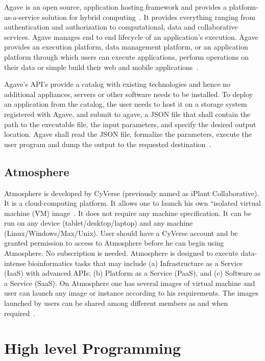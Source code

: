 Agave is an open source, application hosting framework and provides a
platform-as-a-service solution for hybrid
computing~\cite{agave-paper}. It provides everything ranging from
authentication and authorization to computational, data and
collaborative services. Agave manages end to end lifecycle of an
application’s execution.  Agave provides an execution platform, data
management platform, or an application platform through which users
can execute applications, perform operations on their data or simple
build their web and mobile applications~\cite{www-agaveapi-features}.

Agave’s API’s provide a catalog with existing technologies and hence
no additional appliances, servers or other software needs to be
installed. To deploy an application from the catalog, the user needs
to host it on a storage system registered with Agave, and submit to
agave, a JSON file that shall contain the path to the executable file,
the input parameters, and specify the desired output location. Agave
shall read the JSON file, formalize the parameters, execute the user
program and dump the output to the requested
destination~\cite{agave-paper}.

\subsection{Atmosphere}

Atmosphere is developed by CyVerse (previously named as iPlant
Collaborative).  It is a cloud-computing platform. It allows one to
launch his own ``isolated virtual machine (VM) image~\cite{www-at1}.
It does not require any machine specification. It can be run on any
device (tablet/desktop/laptop) and any machine
(Linux/Windows/Max/Unix).  User should have a CyVerse account and be
granted permission to access to Atmosphere before he can begin using
Atmosphere. No subscription is needed.  Atmosphere is designed to
execute data-intense bioinformatics tasks that may include
(a) Infrastructure as a Service (IaaS) with advanced APIs; (b) Platform as
a Service (PaaS), and (c) Software as a Service (SaaS).  On Atmosphere
one has several images of virtual machine and user can launch any
image or instance according to his requirements.  The images launched
by users can be shared among different members as and when
required~\cite{www-at2}.

\section{High level Programming}
\label{S:o-programming}

